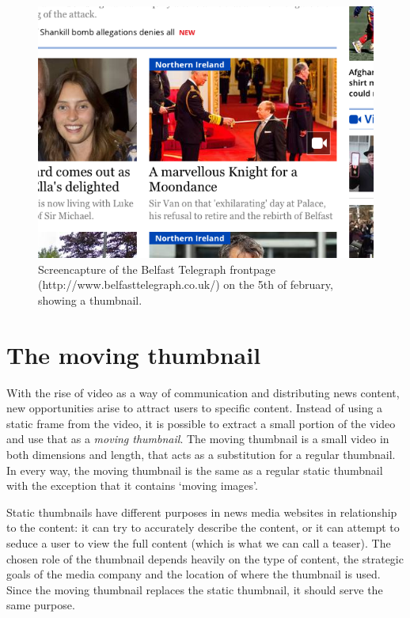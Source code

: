 \documentclass{../resources/acm_proc_article-sp}
\begin{document}
\begin{figure}[h]
  \includegraphics[width=\linewidth]{images/belfast-telegraph-thumbnail}
  \caption{Screencapture of the Belfast Telegraph frontpage (http://www.belfasttelegraph.co.uk/) on the 5th of february, showing a thumbnail.}
\end{figure}


\section{The moving thumbnail}

With the rise of video as a way of communication and distributing news content, new opportunities arise to attract users to specific content. Instead of using a static frame from the video, it is possible to extract a small portion of the video and use that as a \textit{moving thumbnail}. The moving thumbnail is a small video in both dimensions and length, that acts as a substitution for a regular thumbnail. In every way, the moving thumbnail is the same as a regular static thumbnail with the exception that it contains `moving images'.

Static thumbnails have different purposes in news media websites in relationship to the content: it can try to accurately describe the content, or it can attempt to seduce a user to view the full content (which is what we can call a teaser). The chosen role of the thumbnail depends heavily on the type of content, the strategic goals of the media company and the location of where the thumbnail is used. Since the moving thumbnail replaces the static thumbnail, it should serve the same purpose.
\end{document}
